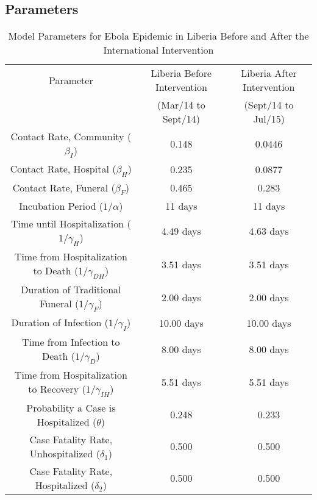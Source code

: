 \subsection{Parameters}

\begin{table}[ht]
\caption{Model Parameters for Ebola Epidemic in Liberia Before  and After the International Intervention} %
\centering %
\begin{tabular}{c c c } 
\hline\hline %
Parameter & Liberia Before Intervention  & Liberia After Intervention \\ [0.5ex] 
 & (Mar/14 to Sept/14) &  (Sept/14 to Jul/15) \\ [0.5ex] %
\hline %
Contact Rate, Community  ($\beta_{I}$) & 0.148 & 0.0446  \\ 
Contact Rate, Hospital  ($\beta_{H}$) & 0.235 & 0.0877  \\
Contact Rate, Funeral  ($\beta_{F}$) & 0.465 & 0.283 \\
Incubation Period (${1}/{\alpha}$) & 11 days & 11 days  \\
Time until Hospitalization (${1}/{\gamma_{H}}$) & 4.49 days & 4.63 days  \\
Time from Hospitalization to Death (${1}/{\gamma_{DH}}$) & 3.51 days & 3.51 days  \\ 
Duration of Traditional Funeral (${1}/{\gamma_{F}}$) & 2.00 days & 2.00 days  \\
Duration of Infection (${1}/{\gamma_{I}}$) & 10.00 days & 10.00 days  \\
Time from Infection to Death (${1}/{\gamma_{D}}$) & 8.00 days & 8.00 days  \\
Time from Hospitalization to Recovery (${1}/{\gamma_{IH}}$) & 5.51 days & 5.51 days  \\
Probability a Case is Hospitalized ($\theta$) & 0.248 & 0.233 \\
Case Fatality Rate, Unhospitalized ($\delta_{1}$) & 0.500  & 0.500  \\
Case Fatality Rate, Hospitalized ($\delta_{2}$) & 0.500 & 0.500 \\ [1ex] 
\hline 
\end{tabular}
\label{tab:parameters}
\end{table}


